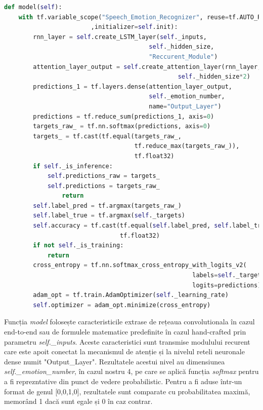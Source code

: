 \documentclass[a4paper,12pt]{book}
\begin{document}
		\begin{lstlisting}[language=Python, caption={Functia care creaza graficul de executie Tensorflow, conectand toate componentele de procesare ale sistemului SER.}]	
def model(self):
	with tf.variable_scope("Speech_Emotion_Recognizer", reuse=tf.AUTO_REUSE
						,initializer=self.init):
		rnn_layer = self.create_LSTM_layer(self._inputs, 
										self._hidden_size, 
										"Reccurent_Module")		
		attention_layer_output = self.create_attention_layer(rnn_layer, 
												self._hidden_size*2)
		predictions_1 = tf.layers.dense(attention_layer_output, 
										self._emotion_number, 
										name="Output_Layer")
		predictions = tf.reduce_sum(predictions_1, axis=0)		
		targets_raw_ = tf.nn.softmax(predictions, axis=0)		
		targets_ = tf.cast(tf.equal(targets_raw_, 
									tf.reduce_max(targets_raw_)), 
									tf.float32)
		if self._is_inference:
			self.predictions_raw = targets_
			self.predictions = targets_raw_
				return					
		self.label_pred = tf.argmax(targets_raw_)
		self.label_true = tf.argmax(self._targets)		
		self.accuracy = tf.cast(tf.equal(self.label_pred, self.label_true),
								tf.float32)
		if not self._is_training:
			return
		cross_entropy = tf.nn.softmax_cross_entropy_with_logits_v2(
													labels=self._targets, 
													logits=predictions)	
		adam_opt = tf.train.AdamOptimizer(self._learning_rate)
		self.optimizer = adam_opt.minimize(cross_entropy)	\end{lstlisting}
		Funcția \textit{model} folosește caracteristicile extrase de rețeaua convolutionala în cazul end-to-end sau de formulele matematice predefinite în cazul hand-crafted prin parametru \textit{self.\_inputs}. Aceste caracteristici sunt transmise modulului recurent care este apoit conectat la mecanismul de atenție și la nivelul reteli neuronale dense numit "Output\_Layer". Rezultatele acestui nivel au dimensiunea \textit{self.\_emotion\_number}, în cazul nostru 4, pe care se aplică funcția \textit{softmax} pentru a fi reprezntative din punct de vedere probabilistic. Pentru a fi aduse într-un format de genul [0,0,1,0], rezultatele sunt comparate cu probabilitatea maximă, memorând 1 dacă sunt egale și 0 în caz contrar. \par
		
\end{document}
